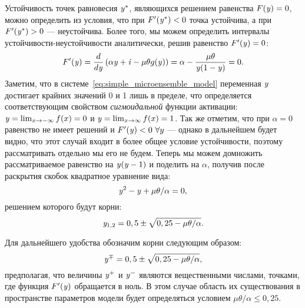 Устойчивость точек равновесия $\mathit{y}^{*}$, являющихся решением равенства $F(\mathit{y}) = 0$, можно определить из условия, что при $F^{\prime}(\mathit{y}^{*}) < 0$ точка устойчива, а при $F^{\prime}(\mathit{y}^{*}) > 0$ --- неустойчива. Более того, мы можем определить интервалы устойчивости-неустойчивости аналитически, решив равенство $F^{\prime}(\mathit{y}) = 0$:
\begin{equation}
    \nonumber
    F^{\prime}(\mathit{y}) 
    = \dfrac{d}{d\mathit{y}}\left( \alpha \mathit{y} + \mathit{i} - \mu \theta g(\mathit{y}) \right) 
    = \alpha - \dfrac{\mu \theta}{\mathit{y}(1 - \mathit{y})}
    = 0.
\end{equation}
Заметим, что в системе~\eqref{eq:simple_microensemble_model} переменная $\mathit{y}$ достигает крайних значений 0 и 1 лишь в пределе, что определяется соответствующим свойством \textit{сигмоидальной} функции активации: $\mathit{y} = \lim_{x \to -\infty} f(x) = 0$ и $\mathit{y} = \lim_{x \to \infty} f(x) = 1$. Так же отметим, что при $\alpha = 0$ равенство не имеет решений и $F^{\prime}(\mathit{y}) < 0\ \forall y$ --- однако в дальнейшем будет видно, что этот случай входит в более общее условие устойчивости, поэтому рассматривать отдельно мы его не будем. Теперь мы можем домножить рассматриваемое равенство на $\mathit{y}(\mathit{y} - 1)$ и поделить на $\alpha$, получив после раскрытия скобок квадратное уравнение вида:
\begin{equation}
    \nonumber
    \mathit{y}^{2} - \mathit{y} + \mu \theta / \alpha = 0,
\end{equation}
решением которого будут корни:
\begin{equation}
    \nonumber
    \mathit{y}_{1,2} = 0,5 \pm \sqrt{0,25 - \mu \theta / \alpha}.
\end{equation}

Для дальнейшего удобства обозначим корни следующим образом:
\begin{equation}
    \label{eq:sigm_stability_bounds_y}
    \mathit{y}^{\mp} = 0,5 \pm \sqrt{0,25 - \mu \theta / \alpha},
\end{equation}
предполагая, что величины $\mathit{y}^{+}$ и $\mathit{y}^{-}$ являются вещественными числами, \ie точками, где функция $F^{\prime}(\mathit{y})$ обращается в ноль. В этом случае область их существования в пространстве параметров модели будет определяться условием $\mu \theta / \alpha \le 0,25$.

